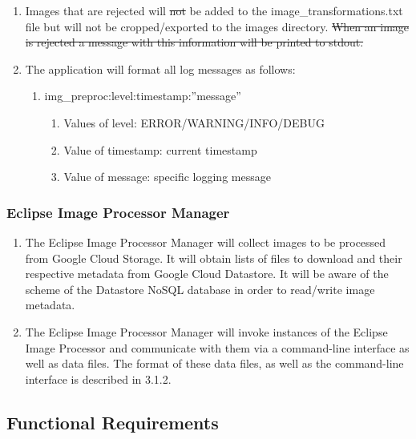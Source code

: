 \documentclass[10pt, onecolumn, draftclsnofoot, letterpaper, compsoc]{IEEEtran}
\begin{document}
\begin{enumerate}
		 \item Images that are rejected will \sout{not} be added to the 
		 image\_transformations.txt file but will not be cropped/exported to
		 the images directory. \sout{When an image is rejected a message with this 
		 information will be printed to stdout.}

		 \item The application will format all log messages as follows:
		 \begin{enumerate}
		 	\item img\_preproc:level:timestamp:”message”
		 	\begin{enumerate}
		 		\item Values of level: ERROR/WARNING/INFO/DEBUG
		 		\item Value of timestamp: current timestamp
		 		\item Value of message: specific logging message
		 	\end{enumerate}
		 \end{enumerate}
	\end{enumerate}

\subsubsection{Eclipse Image Processor Manager}
	\begin{enumerate}
		\item The Eclipse Image Processor Manager will collect images to be processed
		from Google Cloud Storage. It will obtain lists of files to download and their
		respective metadata from Google Cloud Datastore. It will be aware of the scheme 
		of the Datastore NoSQL database in order to read/write image metadata.
		
		\item The Eclipse Image Processor Manager will invoke instances of the Eclipse 
		Image Processor and communicate with them via a command-line interface as well
		as data files. The format of these data files, as well as the command-line interface
		is described in 3.1.2.
	\end{enumerate}

\subsection{Functional Requirements}
\end{document}
